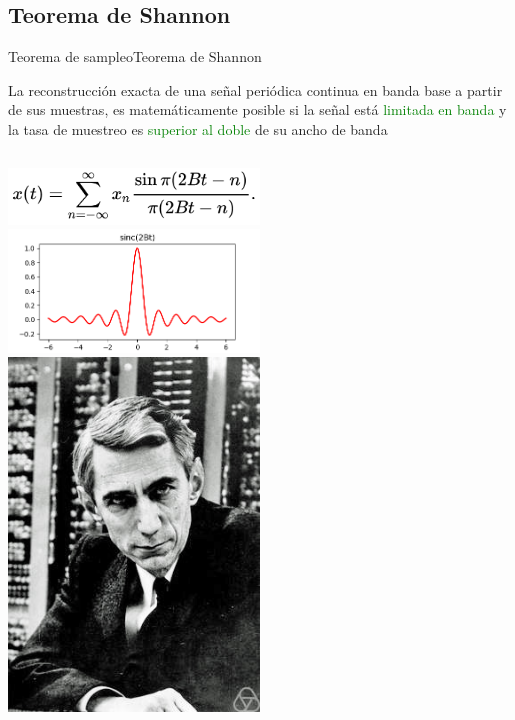  \subsection{Teorema de Shannon}
 \begin{frame}[c]{Teorema de sampleo}{Teorema de Shannon}
    \begin{teorema}
       La reconstrucción exacta de una señal periódica continua en banda base a partir de sus muestras, es matemáticamente posible si la señal está \textcolor{green}{limitada en banda} y la tasa de muestreo es \textcolor{green}{superior al doble} de su ancho de banda
    \end{teorema}
    \begin{columns}[onlytextwidth]
       \center\includegraphics[width=0.5\textwidth]{1_clase/shannon} \\
       \center\includegraphics[width=0.5\textwidth]{1_clase/sinc_limpia}
       \center\includegraphics[width=0.5\textwidth]{1_clase/claude_shannon}
    \end{columns}
    \vfill
 \end{frame}
